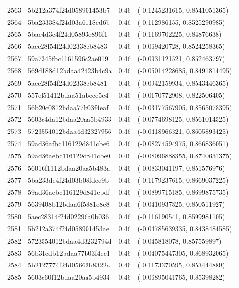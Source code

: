 \begin{table}[ht]
\begin{tabular}{rlrl}
  2563 & 5b212a374f24d058901453b7 & 0.46 & (-0.1245231615, 0.8541051365) \\ 
  2564 & 5ba233384f24d03a6118ed6b & 0.46 & (-0.112986155, 0.8525290985) \\ 
  2565 & 5bae4d3c4f24d05893e896f1 & 0.46 & (-0.1169702225, 0.84876638) \\ 
  2566 & 5aec28f54f24d02338eb8483 & 0.46 & (-0.069420728, 0.8524258365) \\ 
  2567 & 59a7345fbc1161596c2ae019 & 0.46 & (-0.0931121521, 0.852463797) \\ 
  2568 & 569d188d12bdaa42423b4c9a & 0.46 & (-0.05014228685, 0.8491814495) \\ 
  2569 & 5aec28f54f24d02338eb8481 & 0.46 & (-0.0942159934, 0.8543446365) \\ 
  2570 & 557ef51412bdaa51abece5c4 & 0.46 & (-0.0170772908, 0.822506405) \\ 
  2571 & 56b20c0812bdaa77b03f4eaf & 0.46 & (-0.03177567905, 0.8565078395) \\ 
  2572 & 5603e4da12bdaa20aa5b4933 & 0.46 & (-0.0774698125, 0.8561014525) \\ 
  2573 & 5723554012bdaa4d32327956 & 0.46 & (-0.0418966321, 0.8605893425) \\ 
  2574 & 59ad36afbc116129d841cbe6 & 0.46 & (-0.08274594975, 0.866836051) \\ 
  2575 & 59ad36aebc116129d841cbe0 & 0.46 & (-0.08096888355, 0.8740631375) \\ 
  2576 & 56016f1112bdaa20aa5b483a & 0.46 & (-0.0833041197, 0.851576976) \\ 
  2577 & 5ba233de4f24d03b08fdee9b & 0.46 & (-0.1179237615, 0.8669037225) \\ 
  2578 & 59ad36aebc116129d841cbdf & 0.46 & (-0.0899715185, 0.8699875735) \\ 
  2579 & 5639408b12bdaa6f5881e8c8 & 0.46 & (-0.0410937825, 0.850511927) \\ 
  2580 & 5aec28314f24d02296a0b036 & 0.46 & (-0.116190541, 0.8599981105) \\ 
  2581 & 5b212a374f24d058901453ae & 0.46 & (-0.04785639335, 0.8438484585) \\ 
  2582 & 5723554012bdaa4d3232794d & 0.46 & (-0.045818078, 0.857559897) \\ 
  2583 & 56b31cdb12bdaa77b03f4ec1 & 0.46 & (-0.04075447305, 0.868932065) \\ 
  2584 & 5b2127774f24d05662b8322a & 0.46 & (-0.1173370595, 0.853444889) \\ 
  2585 & 5603e60f12bdaa20aa5b4934 & 0.46 & (-0.06895041765, 0.85398282) \\ 

\end{tabular}
\end{table}
